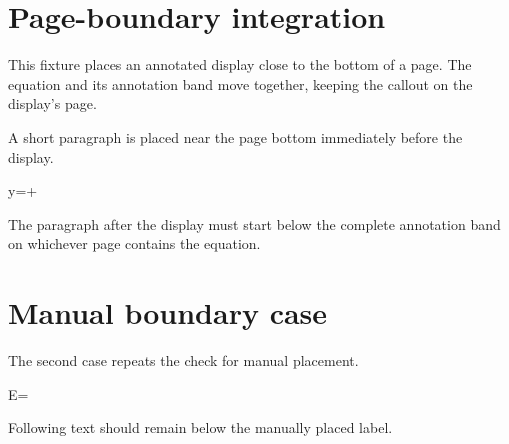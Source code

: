 \documentclass[11pt]{article}
\begin{document}
\section*{Page-boundary integration}
This fixture places an annotated display close to the bottom of a page. The equation and its annotation band move together, keeping the callout on the display's page.

\vspace*{0.58\textheight}
A short paragraph is placed near the page bottom immediately before the display.
\begin{annotatedequation}[numbered]
y=+
\end{annotatedequation}
The paragraph after the display must start below the complete annotation band on whichever page contains the equation.

\section*{Manual boundary case}
The second case repeats the check for manual placement.
\vspace*{0.38\textheight}
\begin{annotatedequation}
E=
\end{annotatedequation}
Following text should remain below the manually placed label.
\end{document}

